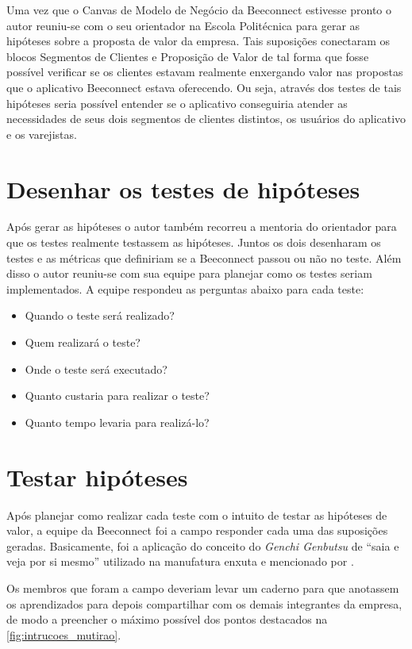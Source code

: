 Uma vez que o Canvas de Modelo de Negócio da Beeconnect estivesse pronto o autor reuniu-se com o seu orientador na Escola Politécnica para gerar as hipóteses sobre a proposta de valor da empresa. Tais suposições conectaram os blocos Segmentos de Clientes e Proposição de Valor de tal forma que fosse possível verificar se os clientes estavam realmente enxergando valor nas propostas que o aplicativo Beeconnect estava oferecendo. Ou seja, através dos testes de tais hipóteses seria possível entender se o aplicativo conseguiria atender as necessidades de seus dois segmentos de clientes distintos, os usuários do aplicativo e os varejistas.

\section{Desenhar os testes de hipóteses}
\label{cha:desenhar_hipoteses}
Após gerar as hipóteses o autor também recorreu a mentoria do orientador para que os testes realmente testassem as hipóteses. Juntos os dois desenharam os testes e as métricas que definiriam se a Beeconnect passou ou não no teste. 
Além disso o autor reuniu-se com sua equipe para planejar como os testes seriam implementados. A equipe respondeu as perguntas abaixo para cada teste:
\begin{itemize}
\item Quando o teste será realizado?
\item Quem realizará o teste?
\item Onde o teste será executado?
\item Quanto custaria para realizar o teste?
\item Quanto tempo levaria para realizá-lo?
\end{itemize}

\section{Testar hipóteses}
\label{cha:testar_hipoteses}
Após planejar como realizar cada teste com o intuito de testar as hipóteses de valor, a equipe da Beeconnect foi a campo responder cada uma das suposições geradas. Basicamente, foi a aplicação do conceito do \textit{Genchi Genbutsu} de \enquote{saia e veja por si mesmo} utilizado na manufatura enxuta e mencionado por .

Os membros que foram a campo deveriam levar um caderno para que anotassem os aprendizados para depois compartilhar com os demais integrantes da empresa, de modo a preencher o máximo possível dos pontos destacados na \autoref{fig:intrucoes_mutirao}. 

